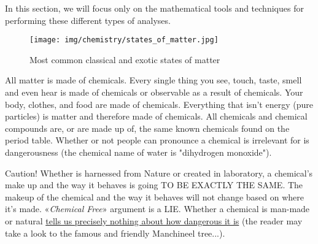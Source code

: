 	In this section, we will focus only on the mathematical tools and techniques for performing these different types of analyses.
	
	\begin{figure}[H]
		\centering
		\texttt{[image: img/chemistry/states\_of\_matter.jpg]}	
		\caption{Most common classical and exotic states of matter}
	\end{figure}
	
	\begin{tcolorbox}[title=Remark,arc=10pt,breakable,drop lifted shadow,
  skin=enhanced,
  skin first is subskin of={enhancedfirst}{arc=10pt,no shadow},
  skin middle is subskin of={enhancedmiddle}{arc=10pt,no shadow},
  skin last is subskin of={enhancedlast}{drop lifted shadow}]
	All matter is made of chemicals. Every single thing you see, touch, taste, smell and even hear is made of chemicals or observable as a result of chemicals. Your body, clothes, and food are made of chemicals. Everything that isn't energy (pure particles) is matter and therefore made of chemicals. All chemicals and chemical compounds are, or are made up of, the same known chemicals found on the period table. Whether or not people can pronounce a chemical is irrelevant for is dangerousness (the chemical name of water is "dihydrogen monoxide"). 
	\end{tcolorbox}
	
	\begin{tcolorbox}[enhanced,colback=red!5!white,colframe=black!50!red,boxrule=1pt,arc=0pt,outer arc=0pt,drop lifted shadow,after skip=10pt plus 2pt]
	\bcbombe Caution! Whether is harnessed from Nature or created in laboratory, a chemical's make up and the way it behaves is going TO BE EXACTLY THE SAME. The makeup of the chemical and the way it behaves will not change based on where it's made. «\textit{Chemical Free}» argument is a LIE. Whether a chemical is man-made or natural \underline{tells us precisely nothing about how dangerous it is} (the reader may take a look to the famous and friendly Manchineel tree...).
	\end{tcolorbox}

